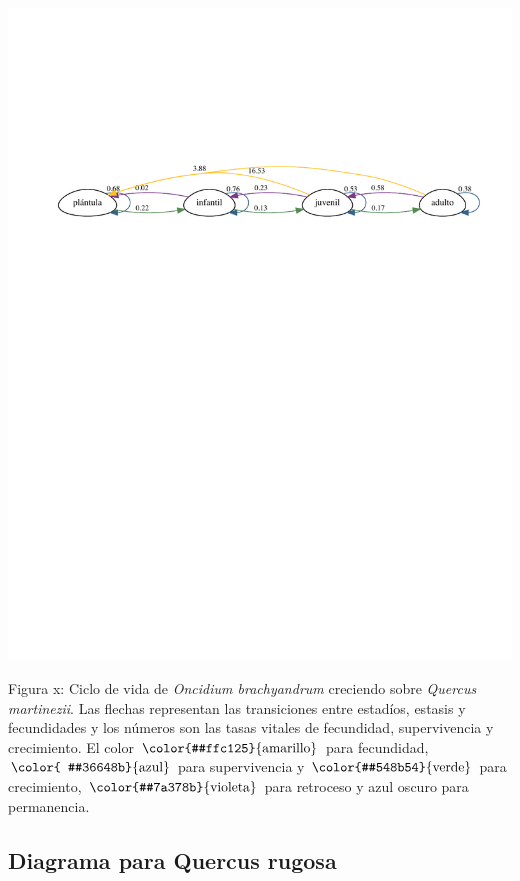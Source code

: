 \documentclass[
]{book}
\theoremstyle{definition}
\theoremstyle{definition}
\theoremstyle{definition}
\theoremstyle{definition}
\theoremstyle{remark}
\begin{document}
\includegraphics{Diagnostico_Poblacional_files/figure-latex/unnamed-chunk-23-1.pdf}

\vspace{-5truemm}

Figura x: Ciclo de vida de \emph{Oncidium brachyandrum} creciendo sobre \emph{Quercus martinezii}. Las flechas representan las transiciones entre estadíos, estasis y fecundidades y los números son las tasas vitales de fecundidad, supervivencia y crecimiento. El color \(\color{#ffc125}{\text{amarillo}}\) para fecundidad, \(\color{  #36648b}{\text{azul}}\) para supervivencia y \(\color{#548b54}{\text{verde}}\) para crecimiento, \(\color{#7a378b}{\text{violeta}}\) para retroceso y azul oscuro para permanencia.

\subsection{Diagrama para Quercus rugosa}\label{diagrama-para-quercus-rugosa}
\end{document}
